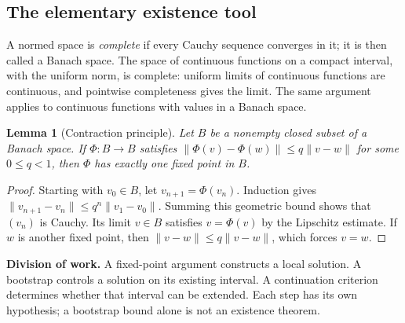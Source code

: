 \documentclass[a4paper,10pt]{article}
\numberwithin{equation}{section}
\newtheorem{lemma}[theorem]{Lemma}
\theoremstyle{definition}
\theoremstyle{remark}
\newcommand{\norm}[1]{\lVert#1\rVert}
\begin{document}
\subsection*{The elementary existence tool}
A normed space is \emph{complete} if every Cauchy sequence converges in it;
it is then called a Banach space. The space of continuous functions on a
compact interval, with the uniform norm, is complete: uniform limits of
continuous functions are continuous, and pointwise completeness gives the limit.
The same argument applies to continuous functions with values in a Banach space.

\begin{lemma}[Contraction principle]\label{lem:contraction}
Let $B$ be a nonempty closed subset of a Banach space. If
$\Phi:B\to B$ satisfies
$\norm{\Phi(v)-\Phi(w)}\leq q\norm{v-w}$ for some $0\leq q<1$, then
$\Phi$ has exactly one fixed point in $B$.
\end{lemma}
\begin{proof}
Starting with $v_0\in B$, let $v_{n+1}=\Phi(v_n)$. Induction gives
$\norm{v_{n+1}-v_n}\leq q^n\norm{v_1-v_0}$. Summing this geometric bound
shows that $(v_n)$ is Cauchy. Its limit $v\in B$ satisfies $v=\Phi(v)$ by
the Lipschitz estimate. If $w$ is another fixed point, then
$\norm{v-w}\leq q\norm{v-w}$, which forces $v=w$.
\end{proof}

\textbf{Division of work.} A fixed-point argument constructs a local solution.
A bootstrap controls a solution on its existing interval. A continuation
criterion determines whether that interval can be extended. Each step has
its own hypothesis; a bootstrap bound alone is not an existence theorem.
\end{document}
